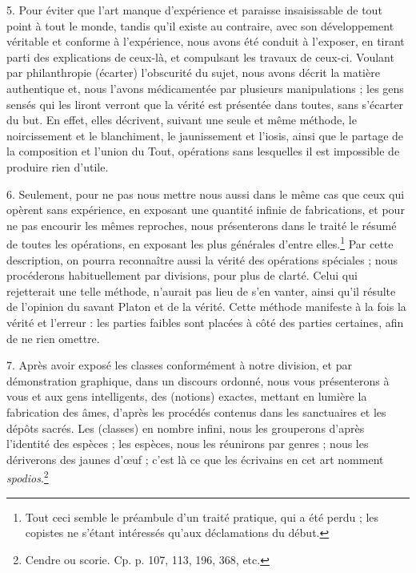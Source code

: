 \documentclass[a4paper, 11pt, oneside, polutonikogreek, french]{article}
\begin{document}
5. Pour éviter que l'art manque d'expérience et paraisse insaisissable de tout point à tout le monde, tandis qu'il existe au contraire, avec son développement véritable et conforme à l'expérience, nous avons été conduit à l'exposer, en tirant parti des explications de ceux-là, et compulsant les travaux de ceux-ci. Voulant par philanthropie (écarter) l'obscurité du sujet, nous avons décrit la matière authentique et, nous l'avons médicamentée par plusieurs manipulations ; les gens sensés qui les liront verront que la vérité est présentée dans toutes, sans s'écarter du but. En effet, elles décrivent, suivant une seule et même méthode, le noircissement et le blanchiment, le jaunissement et l'iosis, ainsi que le partage de la composition et l'union du Tout, opérations sans lesquelles il est impossible de produire rien d'utile.

6. Seulement, pour ne pas nous mettre nous aussi dans le même cas que ceux qui opèrent sans expérience, en exposant une quantité infinie de fabrications, et pour ne pas encourir les mêmes reproches, nous présenterons dans le traité le résumé de toutes les opérations, en exposant les plus générales d'entre elles.\footnote{Tout ceci semble le préambule d'un traité pratique, qui a été perdu ; les copistes ne s'étant intéressés qu'aux déclamations du début.} Par cette description, on pourra reconnaître aussi la vérité des opérations spéciales ; nous procéderons habituellement par divisions, pour plus de clarté. Celui qui rejetterait une telle méthode, n'aurait pas lieu de s'en vanter, ainsi qu'il résulte de l'opinion du savant Platon et de la vérité. Cette méthode manifeste à la fois la vérité et l'erreur : les parties faibles sont placées à côté des parties certaines, afin de ne rien omettre.

7. Après avoir exposé les classes conformément à notre division, et par démonstration graphique, dans un discours ordonné, nous vous présenterons à vous et aux gens intelligents, des (notions) exactes, mettant en lumière la fabrication des âmes, d'après les procédés contenus dans les sanctuaires et les dépôts sacrés. Les (classes) en nombre infini, nous les grouperons d'après l'identité des espèces ; les espèces, nous les réunirons par genres ; nous les dériverons des jaunes d'œuf ; c'est là ce que les écrivains en cet art nomment \emph{spodios}.\footnote{Cendre ou scorie. Cp. p. 107, 113, 196, 368, etc.}
\end{document}
